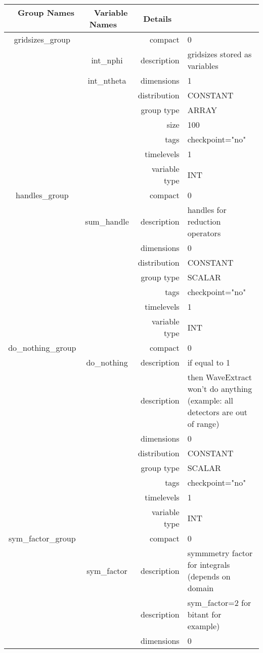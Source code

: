 \begin{tabular*}{150mm}{|c|c@{\extracolsep{\fill}}|rl|} \hline 
~ {\bf Group Names} ~ & ~ {\bf Variable Names} ~  &{\bf Details} ~ & ~\\ 
\hline 
gridsizes\_group &  & compact & 0 \\ 
 & int\_nphi & description & gridsizes stored as variables \\ 
 & int\_ntheta & dimensions & 1 \\ 
 &  & distribution & CONSTANT \\ 
 &  & group type & ARRAY \\ 
 &  & size & 100 \\ 
 &  & tags & checkpoint="no" \\ 
 &  & timelevels & 1 \\ 
 &  & variable type & INT \\ 
\hline 
handles\_group &  & compact & 0 \\ 
 & sum\_handle & description & handles for reduction operators \\ 
 &  & dimensions & 0 \\ 
 &  & distribution & CONSTANT \\ 
 &  & group type & SCALAR \\ 
 &  & tags & checkpoint="no" \\ 
 &  & timelevels & 1 \\ 
 &  & variable type & INT \\ 
\hline 
do\_nothing\_group &  & compact & 0 \\ 
 & do\_nothing & description & if equal to 1 \\ 
& ~ & description &  then WaveExtract won't do anything (example: all detectors are out of range) \\ 
 &  & dimensions & 0 \\ 
 &  & distribution & CONSTANT \\ 
 &  & group type & SCALAR \\ 
 &  & tags & checkpoint="no" \\ 
 &  & timelevels & 1 \\ 
 &  & variable type & INT \\ 
\hline 
sym\_factor\_group &  & compact & 0 \\ 
 & sym\_factor & description & symmmetry factor for integrals (depends on domain \\ 
& ~ & description &  sym\_factor=2 for bitant for example) \\ 
 &  & dimensions & 0 \\ 

\end{tabular*}
